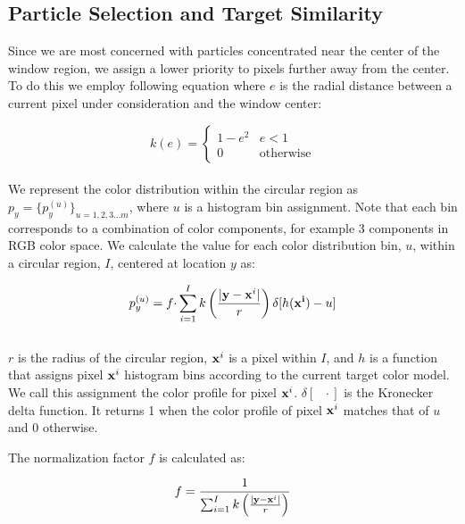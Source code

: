 \documentclass[11pt]{article}
\begin{document}
\subsection{Particle Selection and Target Similarity}

Since we are most concerned with particles concentrated near the center of the window region, we assign a lower priority to pixels further away from the center. To do this we employ following equation where $e$ is the radial distance between a current pixel under consideration and the window center: 

\begin{equation}
k(e) = \begin{cases}
 1 - e^2  & \text{$e < 1$} \\
 0            & \text{otherwise}
\end{cases}
\label{eq:kdist}
\end{equation} \\

We represent the color distribution within the circular region as $p_y = \{p_y^{(u)}\}_{u = 1,2,3 \dots m}$, where $u$ is a histogram bin assignment. Note that each bin corresponds to a combination of color components, for example 3 components in RGB color space. We calculate the value for each color distribution bin, $u$, within a circular region, $I$, centered at location $y$  as:

\begin{equation}
p_y^{(u)} = f \cdotp \sum^I_{i=1} k \left ( \frac{| {\bf y} - {\bf x}^i|}{r} \right ) \delta [h({\bf x^i})-u]
\label{eq:cdist}
\end{equation} \\

$r$ is the radius of the circular region, ${\bf x}^i$ is a pixel within $I$, and $h$ is a function that assigns pixel ${\bf x}^i$ histogram bins according to the current target color model. We call this assignment the color profile for pixel ${\bf x}^i$. $\delta[ \text{ } \cdotp]$ is the Kronecker delta function. It returns 1 when the color profile of pixel ${\bf x}^i$ matches that of $u$ and 0 otherwise.

The normalization factor $f$ is calculated as:

\begin{equation}
f = \frac{1}{\sum^I_{i=1} k \left ( \frac{| {\bf y} - {\bf x}^i|}{r} \right )}
\label{eq:normfact}
\end{equation} \\
\end{document}
